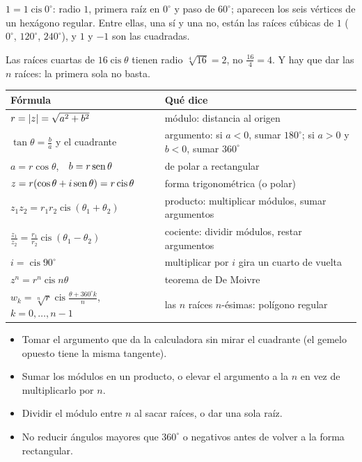 \documentclass[11pt,a4paper]{article}
\newcommand{\cis}{\operatorname{cis}}
\begin{document}
\begin{ejemplo}
$1=1\cis0^\circ$: radio $1$, primera raíz en $0^\circ$ y paso de $60^\circ$; aparecen los seis vértices de un hexágono regular.
Entre ellas, una sí y una no, están las raíces cúbicas de $1$ ($0^\circ$, $120^\circ$, $240^\circ$), y $1$ y $-1$ son las cuadradas.
\end{ejemplo}

\begin{ojo}
Las raíces cuartas de $16\cis\theta$ tienen radio $\sqrt[4]{16}=2$, no $\tfrac{16}{4}=4$. Y hay que dar las $n$ raíces: la
primera sola no basta.
\end{ojo}

\repaso
\begin{center}
\begin{tabularx}{\linewidth}{@{}l L@{}}
\toprule
Fórmula & Qué dice\\ \midrule
$r=\left\lvert z\right\rvert=\sqrt{a^2+b^2}$ & módulo: distancia al origen\\
$\tan\theta=\frac ba$ y el cuadrante & argumento: si $a<0$, sumar $180^\circ$; si $a>0$ y $b<0$, sumar $360^\circ$\\
$a=r\cos\theta$,\ \ $b=r\operatorname{sen}\theta$ & de polar a rectangular\\
$z=r(\cos\theta+i\sen\theta)=r\cis\theta$ & forma trigonométrica (o polar)\\
$z_1z_2=r_1r_2\cis(\theta_1+\theta_2)$ & producto: multiplicar módulos, sumar argumentos\\
$\frac{z_1}{z_2}=\frac{r_1}{r_2}\cis(\theta_1-\theta_2)$ & cociente: dividir módulos, restar argumentos\\
$i=\cis90^\circ$ & multiplicar por $i$ gira un cuarto de vuelta\\
$z^n=r^n\cis n\theta$ & teorema de De Moivre\\
$w_k=\sqrt[n]r\cis\frac{\theta+360^\circ k}{n}$,\ $k=0,\dots,n-1$ & las $n$ raíces $n$-ésimas: polígono regular\\
\bottomrule
\end{tabularx}
\end{center}

\begin{ojo}
\begin{itemize}
\item Tomar el argumento que da la calculadora sin mirar el cuadrante (el gemelo opuesto tiene la misma tangente).
\item Sumar los módulos en un producto, o elevar el argumento a la $n$ en vez de multiplicarlo por $n$.
\item Dividir el módulo entre $n$ al sacar raíces, o dar una sola raíz.
\item No reducir ángulos mayores que $360^\circ$ o negativos antes de volver a la forma rectangular.
\end{itemize}
\end{ojo}
\end{document}
